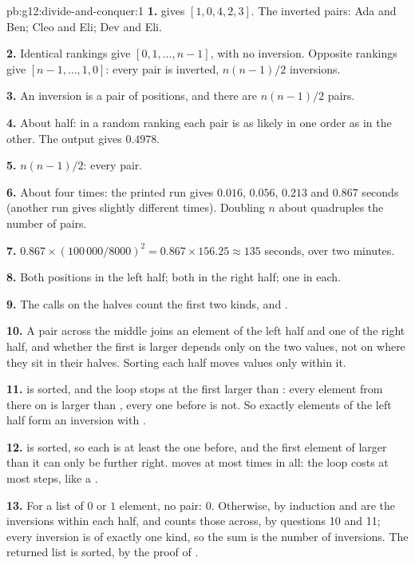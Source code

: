 \begin{solution}{pb:g12:divide-and-conquer:1}
\textbf{1.}  gives $[1, 0, 4, 2, 3]$. The inverted pairs: Ada and Ben; Cleo and Eli; Dev and Eli.

\textbf{2.} Identical rankings give $[0, 1, \dots, n - 1]$, with no inversion. Opposite rankings give
$[n - 1, \dots, 1, 0]$: every pair is inverted, $n(n - 1)/2$ inversions.

\textbf{3.} An inversion is a pair of positions, and there are $n(n - 1)/2$ pairs.

\textbf{4.} About half: in a random ranking each pair is as likely in one order as in the other. The output gives
$0.4978$.

\textbf{5.} $n(n - 1)/2$: every pair.

\textbf{6.} About four times: the printed run gives $0.016$, $0.056$, $0.213$ and $0.867$ seconds (another run gives
slightly different times). Doubling $n$ about quadruples the number of pairs.

\textbf{7.} $0.867 \times (100\,000 / 8000)^2 = 0.867 \times 156.25 \approx 135$ seconds, over two minutes.

\textbf{8.} Both positions in the left half; both in the right half; one in each.

\textbf{9.} The calls on the halves count the first two kinds,  and .

\textbf{10.} A pair across the middle joins an element of the left half and one of the right half, and whether the
first is larger depends only on the two values, not on where they sit in their halves. Sorting each half moves values
only within it.

\textbf{11.}  is sorted, and the  loop stops at the first  larger than
: every element from there on is larger than , every one before is not. So exactly
 elements of the left half form an inversion with .

\textbf{12.}  is sorted, so each  is at least the one before, and the first element of
 larger than it can only be further right.  moves at most  times in all: the loop
costs at most  steps, like a .

\textbf{13.} For a list of $0$ or $1$ element, no pair: $0$. Otherwise, by induction  and  are the
inversions within each half, and  counts those across, by questions 10 and 11; every inversion is of
exactly one kind, so the sum is the number of inversions. The returned list is sorted, by the proof of .


\end{solution}
